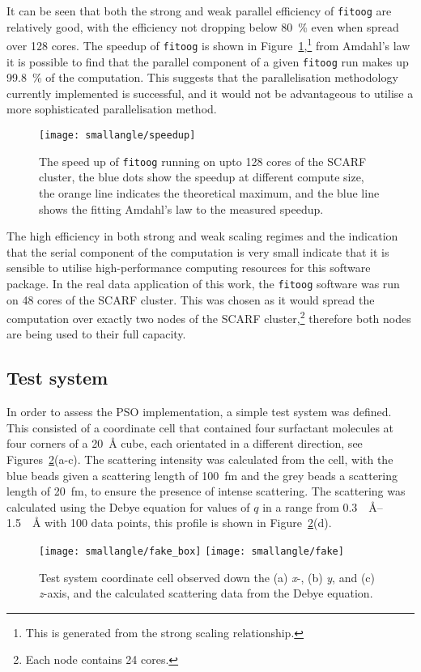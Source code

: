 It can be seen that both the strong and weak parallel efficiency of \texttt{fitoog} are relatively good, with the efficiency not dropping below \SI{80}{\percent} even when spread over 128 cores.
The speedup of \texttt{fitoog} is shown in Figure~\ref{fig:speedup},\footnote{This is generated from the strong scaling relationship.} from Amdahl's law\autocite{amdahl_validity_1967} it is possible to find that the parallel component of a given \texttt{fitoog} run makes up \SI{99.8}{\percent} of the computation.
This suggests that the parallelisation methodology currently implemented is successful, and it would not be advantageous to utilise a more sophisticated parallelisation method.
%
\begin{figure}[t]
    \forcerectofloat
    \centering
    \texttt{[image: smallangle/speedup]}
    \caption{The speed up of \texttt{fitoog} running on upto 128 cores of the SCARF cluster, the blue dots show the speedup at different compute size, the orange line indicates the theoretical maximum, and the blue line shows the fitting Amdahl's law to the measured speedup.}
    \label{fig:speedup}
\end{figure}
%

The high efficiency in both strong and weak scaling regimes and the indication that the serial component of the computation is very small indicate that it is sensible to utilise high-performance computing resources for this software package.
In the real data application of this work, the \texttt{fitoog} software was run on 48 cores of the SCARF cluster.
This was chosen as it would spread the computation over exactly two nodes of the SCARF cluster,\footnote{Each node contains 24 cores.} therefore both nodes are being used to their full capacity.

\subsection{Test system}
In order to assess the PSO implementation, a simple test system was defined.
This consisted of a coordinate cell that contained four surfactant molecules at four corners of a \SI{20}{\angstrom} cube, each orientated in a different direction, see Figures~\ref{fig:test}(a-c).
The scattering intensity was calculated from the cell, with the blue beads given a scattering length of \SI{100}{\femto\meter} and the grey beads a scattering length of \SI{20}{\femto\meter}, to ensure the presence of intense scattering.
The scattering was calculated using the Debye equation\autocite{debye_zerstreuung_1915} for values of $q$ in a range from \SIrange{0.3}{1.5}{\per\angstrom} with 100 data points, this profile is shown in Figure~\ref{fig:test}(d).
%
\begin{figure}[t]
    \forceversofloat
    \centering
    \texttt{[image: smallangle/fake\_box]}
    \texttt{[image: smallangle/fake]}
    \caption{Test system coordinate cell observed down the (a) \emph{x}-, (b) \emph{y}, and (c) \emph{z}-axis, and the calculated scattering data from the Debye equation.}
    \label{fig:test}
\end{figure}
%


